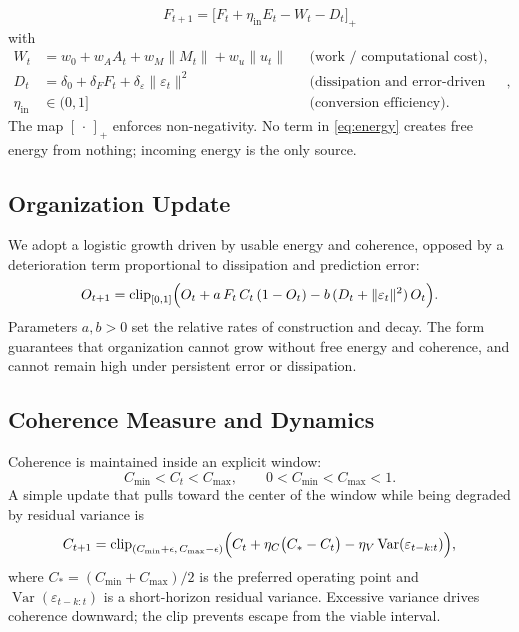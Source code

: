 \documentclass[11pt,a4paper]{article}
\begin{document}
\begin{equation}
  F_{t+1} = \bigl[ F_t + \eta_{\mathrm{in}} E_t - W_t - D_t \bigr]_+
  \label{eq:energy}
\end{equation}
with
\begin{align*}
  W_t &= w_0 + w_A A_t + w_M \|M_t\| + w_u \|u_t\| && \text{(work / computational cost)},\\
  D_t &= \delta_0 + \delta_F F_t + \delta_{\varepsilon} \|\varepsilon_t\|^2 && \text{(dissipation and error-driven loss)},\\
  \eta_{\mathrm{in}} &\in (0,1] && \text{(conversion efficiency)}.
\end{align*}
The map \([\,\cdot\,]_+\) enforces non-negativity. No term in \eqref{eq:energy} creates free energy from nothing; incoming energy is the only source.

\subsection{Organization Update}

We adopt a logistic growth driven by usable energy and coherence, opposed by a deterioration term proportional to dissipation and prediction error:
\begin{equation}
  O_{t+1} = \operatorname{clip}_{[0,1]}\Bigl(
    O_t + a\, F_t\, C_t\, (1-O_t) - b\, (D_t + \|\varepsilon_t\|^2)\, O_t
  \Bigr).
  \label{eq:org}
\end{equation}
Parameters \(a,b > 0\) set the relative rates of construction and decay. The form guarantees that organization cannot grow without free energy and coherence, and cannot remain high under persistent error or dissipation.

\subsection{Coherence Measure and Dynamics}

Coherence is maintained inside an explicit window:
\begin{equation}
  C_{\min} < C_t < C_{\max},\qquad 0 < C_{\min} < C_{\max} < 1.
\end{equation}
A simple update that pulls toward the center of the window while being degraded by residual variance is
\begin{equation}
  C_{t+1} = \operatorname{clip}_{(C_{\min}+\epsilon,\, C_{\max}-\epsilon)}\Bigl(
    C_t + \eta_C\bigl(C_* - C_t\bigr) - \eta_V \operatorname{Var}(\varepsilon_{t-k:t})
  \Bigr),
  \label{eq:coh}
\end{equation}
where \(C_* = (C_{\min}+C_{\max})/2\) is the preferred operating point and \(\operatorname{Var}(\varepsilon_{t-k:t})\) is a short-horizon residual variance. Excessive variance drives coherence downward; the clip prevents escape from the viable interval.
\end{document}
